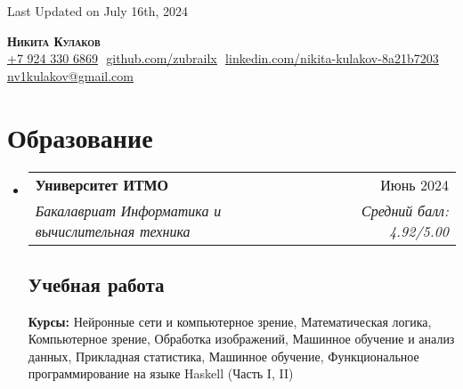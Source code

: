 \documentclass[letterpaper,11pt]{article}
\makeatletter
\newcommand{\resumeSubheading}[4]{
  \vspace{-2pt}\item
    \begin{tabular*}{0.97\textwidth}[t]{l@{\extracolsep{\fill}}r}
      \textbf{#1} & #2 \\
      \textit{\small#3} & \textit{\small #4} \\
    \end{tabular*}\vspace{-7pt}
}
\newcommand{\resumeSubHeadingListStart}{\begin{itemize}[leftmargin=0.15in, label={}]}
\newcommand{\resumeSubHeadingListEnd}{\end{itemize}}
\makeatother
\begin{document}
\begin{flushright}
  \vspace{-4pt}
  \color{gray}
  \item
  Last Updated on July 16th, 2024
\end{flushright}

\vspace{-7pt}

\begin{center}
    \textbf{\huge \scshape Никита Кулаков} \\ \vspace{8pt}
    \small 
    \href{tel:79243306869}{\underline{+7 924 330 6869}} $  $
    \href{https://github.com/zubrailx}{\underline{github.com/zubrailx}} $  $
    \href{https://www.linkedin.com/in/nikita-kulakov-8a21b7203/}{\underline{linkedin.com/nikita-kulakov-8a21b7203}} $  $
    \href{mailto:nv1kulakov@gmail.com}
    {\underline{nv1kulakov@gmail.com}}
\end{center}

\section{Образование}
  \resumeSubHeadingListStart
  
    \resumeSubheading
      {Университет ИТМО}{Июнь 2024}
      {Бакалавриат Информатика и вычислительная техника}{Средний балл: 4.92/5.00}
      
    \subsection{Учебная работа}
      \textbf{Курсы:} Нейронные сети и компьютерное зрение, Математическая логика, Компьютерное зрение, Обработка изображений, Машинное обучение и анализ данных, Прикладная статистика, Машинное обучение, Функциональное программирование на языке Haskell (Часть I, II)\\

  \resumeSubHeadingListEnd

\end{document}
